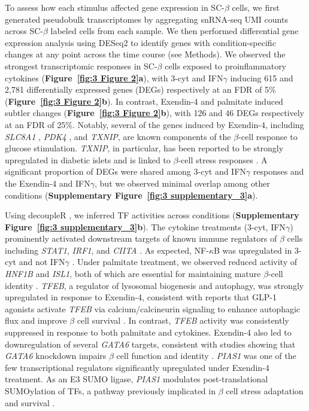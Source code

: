 To assess how each stimulus affected gene expression in SC-$\beta$ cells, we first generated pseudobulk transcriptomes by aggregating snRNA-seq UMI counts across SC-$\beta$ labeled cells from each sample. We then performed differential gene expression analysis using DESeq2 to identify genes with condition-specific changes at any point across the time course (see Methods). We observed the strongest transcriptomic responses in SC-$\beta$ cells exposed to proinflammatory cytokines (\textbf{Figure~\ref{fig:3 Figure 2}\textbf{a}}), with 3-cyt and IFN$\gamma$ inducing 615 and 2,781 differentially expressed genes (DEGs) respectively at an FDR of 5\% (\textbf{Figure~\ref{fig:3 Figure 2}\textbf{b}}). In contrast, Exendin-4 and palmitate induced subtler changes (\textbf{Figure~\ref{fig:3 Figure 2}\textbf{b}}), with 126 and 46 DEGs respectively at an FDR of 25\%. Notably, several of the genes induced by Exendin-4, including \textit{SLC8A1} \cite{Hamming2010-td}, \textit{PDK4} \cite{Arumugam2010-bq}, and \textit{TXNIP}, are known components of the $\beta$-cell response to glucose stimulation. \textit{TXNIP}, in particular, has been reported to be strongly upregulated in diabetic islets and is linked to $\beta$-cell stress responses \cite{Rutter2013-yv}. A significant proportion of DEGs were shared among 3-cyt and IFN$\gamma$ responses and the Exendin-4 and IFN$\gamma$, but we observed minimal overlap among other conditions (\textbf{Supplementary Figure~\ref{fig:3 supplementary_3}\textbf{a}}).

Using decoupleR \cite{Badia-I-Mompel2022-se}, we inferred TF activities across conditions (\textbf{Supplementary Figure~\ref{fig:3 supplementary_3}\textbf{b}}). The cytokine treatments (3-cyt, IFN$\gamma$) prominently activated downstream targets of known immune regulators of $\beta$ cells including \textit{STAT1}, \textit{IRF1}, and \textit{CIITA} \cite{Benaglio2022-rq}. As expected, NF-$\kappa$B was upregulated in 3-cyt and not IFN$\gamma$ \cite{Melloul2008-ox}. Under palmitate treatment, we observed reduced activity of \textit{HNF1B} and \textit{ISL1}, both of which are essential for maintaining mature $\beta$-cell identity \cite{El-Khairi2016-so,Ediger2014-gk}. \textit{TFEB}, a regulator of lysosomal biogenesis and autophagy, was strongly upregulated in response to Exendin-4, consistent with reports that GLP-1 agonists activate \textit{TFEB} via calcium/calcineurin signaling to enhance autophagic flux and improve $\beta$ cell survival \cite{Zummo2022-dr}. In contrast, \textit{TFEB} activity was consistently suppressed in response to both palmitate and cytokines. Exendin-4 also led to downregulation of several \textit{GATA6} targets, consistent with studies showing that \textit{GATA6} knockdown impairs $\beta$ cell function and identity \cite{Villamayor2018-uk}. \textit{PIAS1} was one of the few transcriptional regulators significantly upregulated under Exendin-4 treatment. As an E3 SUMO ligase, \textit{PIAS1} modulates post-translational SUMOylation of TFs, a pathway previously implicated in $\beta$ cell stress adaptation and survival \cite{Li2020-kg}.

